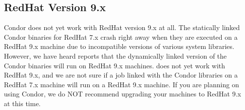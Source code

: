 \subsection{\label{sec:platform-linux-rh9}RedHat Version 9.x}

Condor \VersionNotice  does not yet work with RedHat version 9.x at
all.
The statically linked Condor binaries for RedHat 7.x crash right away
when they are executed on a RedHat 9.x machine due to incompatible
versions of various system libraries.
However, we have heard reports that the dynamically linked version of
the Condor binaries will run on RedHat 9.x machines.
 does not yet work with RedHat 9.x, and we are not
sure if a job linked with the Condor libraries on a RedHat 7.x machine
will run on a RedHat 9.x machine.  
If you are planning on using Condor, we do NOT recommend upgrading
your machines to RedHat 9.x at this time. 

